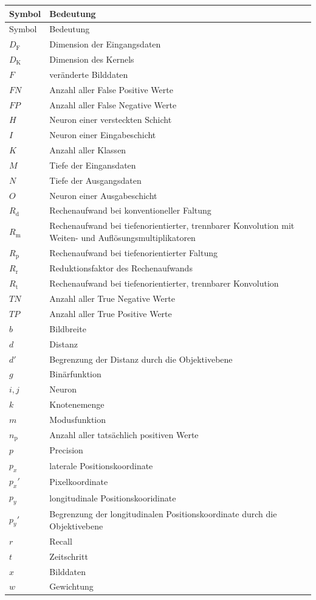 \documentclass[12pt,a4paper,oneside,numbers=noenddot,headsepline,captions=tableheading,toc=bibliography,openany,tikz,margin=5mm]{scrbook}
\begin{document}
	\begin{longtable}{p{3cm}p{8cm}}
		\setlength\tabcolsep{9pt}
		Symbol & Bedeutung \\ \hline
		\endfirsthead
		Symbol & Bedeutung \\ \hline
		
		\endhead
		\toprule 
		$D_\text{F}$&Dimension der Eingangsdaten\\
		$D_\text{K}$&Dimension des Kernels\\
		$F$&veränderte Bilddaten\\
		$FN$&Anzahl aller False Positive Werte\\
		$FP$&Anzahl aller False Negative Werte\\
		$H$&Neuron einer versteckten Schicht\\
		$I$&Neuron einer Eingabeschicht\\
		$K$&Anzahl aller Klassen\\
		$M$&Tiefe der Eingansdaten\\
		$N$&Tiefe der Ausgangsdaten\\
		$O$&Neuron einer Ausgabeschicht\\
		$R_\text{d}$&Rechenaufwand bei konventioneller Faltung\\
		$R_\text{m}$&Rechenaufwand bei tiefenorientierter, trennbarer Konvolution mit Weiten- und Auflösungsmultiplikatoren\\ 
		$R_\text{p}$&Rechenaufwand bei tiefenorientierter Faltung\\
		$R_\text{r}$&Reduktionsfaktor des Rechenaufwands\\
		$R_\text{t}$&Rechenaufwand bei tiefenorientierter, trennbarer Konvolution\\
		$TN$&Anzahl aller True Negative Werte\\
		$TP$&Anzahl aller True Positive Werte\\
		
		$b$&Bildbreite\\
		$d$&Distanz\\
		$d'$&Begrenzung der Distanz durch die Objektivebene\\
		$g$&Binärfunktion\\
		$i, j$&Neuron\\
		$k$&Knotenemenge\\
		$m$&Modusfunktion\\
		$n_\text{p}$&Anzahl aller tatsächlich positiven Werte\\
		$p$&Precision\\
		$p_x$&laterale Positionskoordinate\\
		$p_x'$&Pixelkoordinate\\
		$p_y$&longitudinale Positionskooridinate\\
		$p_y'$&Begrenzung der longitudinalen Positionskoordinate durch die Objektivebene\\
		$r$&Recall\\
		$t$&Zeitschritt\\
		$x$&Bilddaten\\
		$w$&Gewichtung	\\ 
		

\end{longtable}
\end{document}
